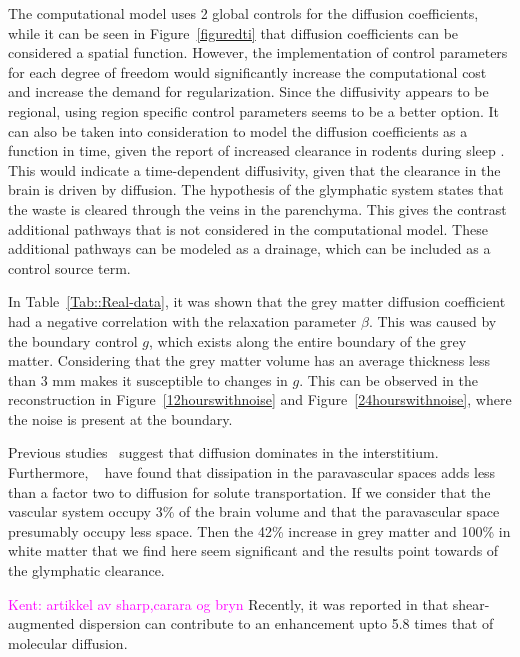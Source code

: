 \documentclass[12pt,a4paper]{article}
\newcommand{\lars}[1]{\textcolor{magenta}{#1}}
\begin{document}
The computational model uses 2 global controls for the diffusion coefficients, while it can be seen in  Figure~\ref{figuredti} that diffusion coefficients can be considered a spatial function. However, the implementation of control parameters for each degree of freedom would significantly increase the computational cost and increase the demand for regularization. Since the diffusivity appears to be regional, using region specific control parameters seems to be a better option.
It can also be taken into consideration to model the diffusion coefficients as a function in time, given the report of increased clearance in rodents during sleep \cite{xie2013sleep}. This would indicate a time-dependent diffusivity, given that the clearance in the brain is driven by diffusion. %
The hypothesis of the glymphatic system \cite{iliff2012paravascular} states that the waste is cleared through the veins in the parenchyma. This gives the contrast additional pathways that is not considered in the computational model. These additional pathways can be modeled as a drainage, which can be included as a control source term. 

In Table~\ref{Tab::Real-data}, it was shown that the grey matter diffusion coefficient had a negative correlation with the relaxation parameter $\beta$. This was caused by the boundary control $g$, which exists along the entire boundary of the grey matter. Considering that the grey matter volume has an average thickness less than 3 mm makes it susceptible to changes in $g$. This can be observed in the reconstruction in Figure~\ref{12hourswithnoise} and Figure~\ref{24hourswithnoise}, where the noise is present at the boundary.
  
Previous studies~\cite{holter2017interstitial, smith2017glymphatic} suggest that diffusion dominates in the interstitium. Furthermore, ~\cite{asgari2016glymphatic, brynjfm, Diem} have found that dissipation in the paravascular spaces adds less than a factor two
to diffusion for solute transportation. If we consider that the vascular system occupy 3\% of the brain volume
and that the paravascular space presumably occupy less space. Then the 42\% increase in grey matter and 100\% in white matter that we find here seem significant and the results point towards of the glymphatic clearance.  

\lars{Kent: artikkel av sharp,carara og bryn} 
Recently, it was reported in \citet{sharp2019dispersion} that shear-augmented dispersion can contribute to an enhancement upto 5.8 times that of molecular diffusion.   
\end{document}
